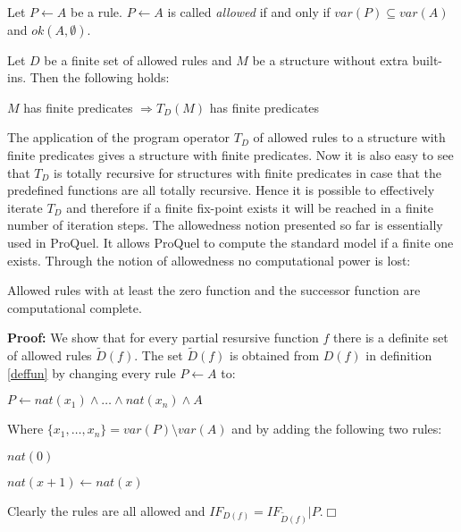 \begin{Def} Let $P\leftarrow A$ be a rule. $P\leftarrow A$ is called {\em allowed} if and only 
if $var(P) \subseteq var(A)$ and $ok(A,\emptyset)$.
\end{Def}

\begin{Lem} Let $D$ be a finite set of allowed rules and $M$ be a structure without extra 
built-ins. Then the following holds:

\begin{center}
$M$ has finite predicates $\Longrightarrow T_D(M)$ has finite predicates
\end{center}
\end{Lem}

The application of the program operator $T_D$ of allowed rules to a structure with finite 
predicates gives a structure with finite predicates. Now it is also easy to see that 
$T_D$ is totally recursive for structures with finite predicates in case that the predefined 
functions are all totally recursive. Hence it is possible to effectively iterate $T_D$
and therefore if a finite fix-point exists it will be reached in a finite number of iteration 
steps. The allowedness notion presented so far is essentially used in ProQuel. It allows 
ProQuel to compute the standard model if a finite one exists. Through the notion of 
allowedness no computational power is lost:

\begin{Pro} Allowed rules with at least the zero function and the successor function
are computational complete.
\end{Pro}

{\bf Proof:} We show that for every partial resursive function $f$ there is a definite set of
allowed rules $\tilde{D}(f)$. The set $\tilde{D}(f)$ is obtained from $D(f)$ in definition
\ref{deffun} by changing every rule $P \leftarrow A$ to:

\quad $P \leftarrow nat(x_1) \wedge \ldots \wedge nat(x_n) \wedge A$

Where $\{x_1,\ldots,x_n\} = var(P) \setminus var(A)$ and by adding the following two rules:

{\small\quad $nat(0)$

\quad $nat(x+1) \leftarrow nat(x)$} 

Clearly the rules are all allowed and $IF_{D(f)} = IF_{\tilde{D}(f)}|P$.\hfill $\Box$


